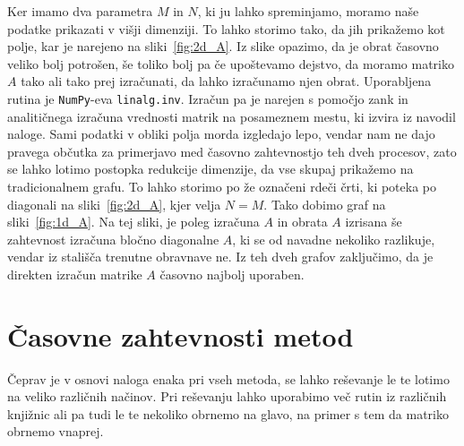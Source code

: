\documentclass[notoc]{porocilo}
\begin{document}
Ker imamo dva parametra $M$ in $N$, ki ju lahko spreminjamo, moramo naše podatke prikazati v višji dimenziji. To lahko storimo tako, da jih prikažemo kot polje, kar je narejeno na sliki~\ref{fig:2d_A}.
Iz slike opazimo, da je obrat časovno veliko bolj potrošen, še toliko bolj pa če upoštevamo dejstvo, da moramo matriko $A$ tako ali tako prej izračunati, da lahko izračunamo njen obrat. Uporabljena rutina je \texttt{NumPy}-eva \texttt{linalg.inv}. Izračun pa je narejen s pomočjo zank in analitičnega izračuna vrednosti matrik na posameznem mestu, ki izvira iz navodil naloge. Sami podatki v obliki polja morda izgledajo lepo, vendar nam ne dajo pravega občutka za primerjavo med časovno zahtevnostjo teh dveh procesov, zato se lahko lotimo postopka redukcije dimenzije, da vse skupaj prikažemo na tradicionalnem grafu. To lahko storimo po že označeni rdeči črti, ki poteka po diagonali na sliki~\ref{fig:2d_A}, kjer velja $N=M$. Tako dobimo graf na sliki~\ref{fig:1d_A}.
Na tej sliki, je poleg izračuna $A$ in obrata $A$ izrisana še zahtevnost izračuna bločno diagonalne $A$, ki se od navadne nekoliko razlikuje, vendar iz stališča trenutne obravnave ne. Iz teh dveh grafov zaključimo, da je direkten izračun matrike $A$ časovno najbolj uporaben.

\section{Časovne zahtevnosti metod}
Čeprav je v osnovi naloga enaka pri vseh metoda, se lahko reševanje le te lotimo na veliko različnih načinov. Pri reševanju lahko uporabimo več rutin iz različnih knjižnic ali pa tudi le te nekoliko obrnemo na glavo, na primer s tem da matriko obrnemo vnaprej.
\end{document}
